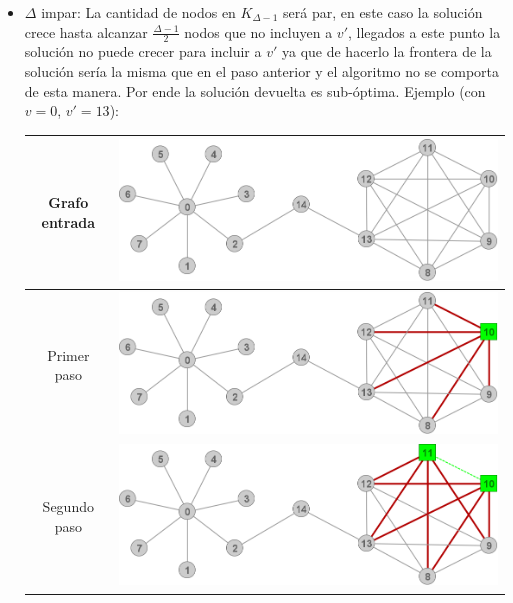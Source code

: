 \begin{itemize}
\begin{center}
\begin{tabular}{|c||c|}
	\end{tabular}
	\end{center}


	\item $\Delta$ impar: La cantidad de nodos en $K_{\Delta -1}$ ser\'a par, 
	en este caso la soluci\'on crece hasta alcanzar $\frac{\Delta -1}{2}$ nodos
	que no incluyen a $v'$, llegados a este punto la soluci\'on no puede crecer
	para incluir a $v'$ ya que de hacerlo la frontera de la soluci\'on ser\'ia
	la misma que en el paso anterior y el algoritmo no se comporta de esta manera.
	Por ende la soluci\'on devuelta es sub-\'optima.
	Ejemplo (con $v = 0$, $v' = 13$):
	\begin{center}
	\begin{tabular}{|c||c|}
		\hline
		Grafo entrada & 
		\includegraphics[scale = 0.2]{img/ej3/busqueda_local/estrellaPuenteCMFPar.png} \\
		\hline
		Primer paso &
		\includegraphics[scale = 0.2]{img/ej3/busqueda_local/estrellaPuenteCMFPar_st01.png} \\
		\hline
		Segundo paso &
		\includegraphics[scale = 0.2]{img/ej3/busqueda_local/estrellaPuenteCMFPar_st02.png} \\

\end{tabular}
\end{center}
\end{itemize}
